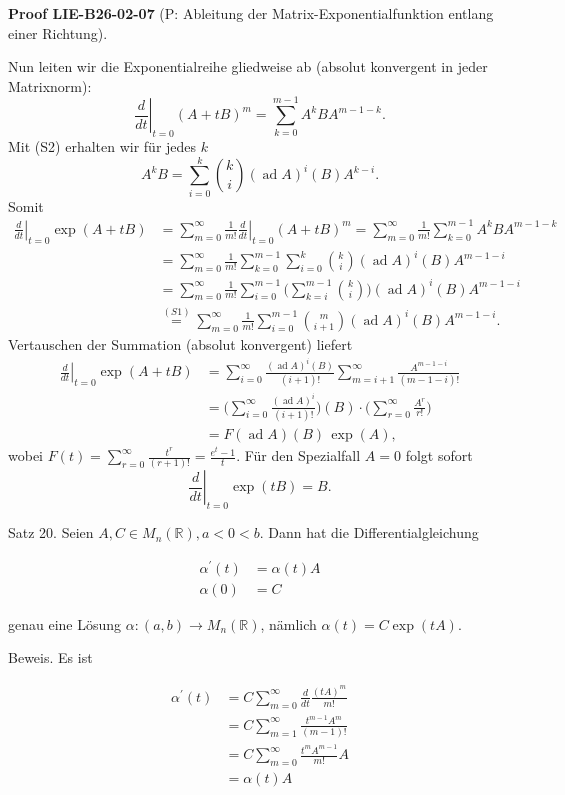\documentclass[10pt, letterpaper]{article}
\newcommand{\CustomHeading}[3]{%
  \par\medskip\noindent%
  \textbf{#1 #2} \textnormal{(#3)}.\enskip%
}
\newenvironment{PROOF}[2]{\begin{unitbox}\CustomHeading{Proof}{#1}{#2}}{\end{unitbox}}
\begin{document}
\begin{PROOF}{LIE-B26-02-07}{P: Ableitung der Matrix-Exponentialfunktion entlang einer Richtung}
Nun leiten wir die Exponentialreihe gliedweise ab (absolut konvergent in jeder Matrixnorm):
\[
\left.\frac{d}{dt}\right|_{t=0} (A+tB)^{m}
= \sum_{k=0}^{m-1} A^{k} B A^{m-1-k}.
\]
Mit (S2) erhalten wir für jedes $k$
\[
A^{k} B = \sum_{i=0}^{k} \binom{k}{i} (\operatorname{ad}A)^{i}(B) A^{k-i}.
\]
Somit
\[
\begin{aligned}
\left.\frac{d}{dt}\right|_{t=0} \exp(A+tB)
&= \sum_{m=0}^{\infty} \frac{1}{m!} \left.\frac{d}{dt}\right|_{t=0} (A+tB)^{m}
= \sum_{m=0}^{\infty} \frac{1}{m!} \sum_{k=0}^{m-1} A^{k} B A^{m-1-k}\\
&= \sum_{m=0}^{\infty} \frac{1}{m!} \sum_{k=0}^{m-1} \sum_{i=0}^{k} \binom{k}{i} (\operatorname{ad}A)^{i}(B) A^{m-1-i}\\
&= \sum_{m=0}^{\infty} \frac{1}{m!} \sum_{i=0}^{m-1} \Big(\sum_{k=i}^{m-1} \binom{k}{i}\Big) (\operatorname{ad}A)^{i}(B) A^{m-1-i}\\
&\stackrel{(S1)}{=} \sum_{m=0}^{\infty} \frac{1}{m!} \sum_{i=0}^{m-1} \binom{m}{i+1} (\operatorname{ad}A)^{i}(B) A^{m-1-i}.
\end{aligned}
\]
Vertauschen der Summation (absolut konvergent) liefert
\[
\begin{aligned}
\left.\frac{d}{dt}\right|_{t=0} \exp(A+tB)
&= \sum_{i=0}^{\infty} \frac{(\operatorname{ad}A)^{i}(B)}{(i+1)!} \sum_{m=i+1}^{\infty} \frac{A^{m-1-i}}{(m-1-i)!}\\
&= \Big(\sum_{i=0}^{\infty} \frac{(\operatorname{ad}A)^{i}}{(i+1)!}\Big)(B) \cdot \Big(\sum_{r=0}^{\infty} \frac{A^{r}}{r!}\Big)\\
&= F(\operatorname{ad}A)(B)\,\exp(A),
\end{aligned}
\]
wobei $F(t)=\sum_{r=0}^{\infty}\frac{t^{r}}{(r+1)!}=\frac{e^{t}-1}{t}$.  
Für den Spezialfall $A=0$ folgt sofort
\[
\left.\frac{d}{dt}\right|_{t=0} \exp(tB) = B.
\]
\end{PROOF}


Satz 20. Seien $A, C \in M_{n}(\mathbb{R}), a<0<b$. Dann hat die Differentialgleichung

$$
\begin{aligned}
\alpha^{\prime}(t) & =\alpha(t) A \\
\alpha(0) & =C
\end{aligned}
$$

genau eine Lösung $\alpha:(a, b) \rightarrow M_{n}(\mathbb{R})$, nämlich $\alpha(t)=C \exp (t A)$.


Beweis. Es ist

$$
\begin{aligned}
\alpha^{\prime}(t) & =C \sum_{m=0}^{\infty} \frac{d}{d t} \frac{(t A)^{m}}{m!} \\
& =C \sum_{m=1}^{\infty} \frac{t^{m-1} A^{m}}{(m-1)!} \\
& =C \sum_{m=0}^{\infty} \frac{t^{m} A^{m-1}}{m!} A \\
& =\alpha(t) A
\end{aligned}
$$
\end{document}
